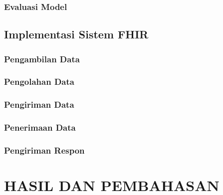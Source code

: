 \documentclass[ugmtesis]{ugmtesis}
\begin{document}
		\subsection{Evaluasi Model}
		\label{implementasi evaluasi model}
		

	\section{Implementasi Sistem FHIR}
	\label{implementasi sistem fhir}
	

		\subsection{Pengambilan Data}
		\label{implementasi pengambilan data}
		

		\subsection{Pengolahan Data}
		\label{implementasi pengolahan data}
		

		\subsection{Pengiriman Data}
		\label{implementasi pengiriman data}
		

		\subsection{Penerimaan Data}
		\label{implementasi penerimaan data}
		

		\subsection{Pengiriman Respon}
		\label{implementasi pengiriman respon}
		





\chapter{HASIL DAN PEMBAHASAN}
\label{hasil dan pembahasan}
\end{document}
